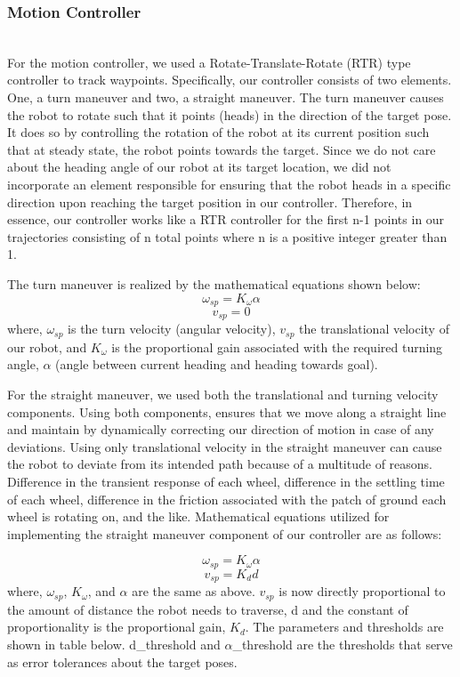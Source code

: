 \documentclass[journal]{IEEEtran}
\begin{document}
\subsubsection{Motion Controller} \hfill\\

For the motion controller, we used a Rotate-Translate-Rotate (RTR) \cite{journals/ker/Parsons04f,spong2005robot} type controller to track waypoints. Specifically, our controller consists of two elements. One, a turn maneuver and two, a straight maneuver. The turn maneuver causes the robot to rotate such that it points (heads) in the direction of the target pose. It does so by controlling the rotation of the robot at its current position such that at steady state, the robot points towards the target. Since we do not care about the heading angle of our robot at its target location, we did not incorporate an element responsible for ensuring that the robot heads in a specific direction upon reaching the target position in our controller. Therefore, in essence, our controller works like a RTR controller for the first n-1 points in our trajectories consisting of n total points where n is a positive integer greater than 1.

The turn maneuver is realized by the mathematical equations shown below:
$$\omega_{sp}=K_\omega \alpha$$
$$v_{sp}=0$$
where, $\omega_{sp}$ is the turn velocity (angular velocity), $v_{sp}$ the translational velocity of our robot, and $K_\omega$ is the proportional gain associated with the required turning angle, $\alpha$ (angle between current heading and heading towards goal).

For the straight maneuver, we used both the translational and turning velocity components. Using both components, ensures that we move along a straight line and maintain by dynamically correcting our direction of motion in case of any deviations. Using only translational velocity in the straight maneuver can cause the robot to deviate from its intended path because of a multitude of reasons. Difference in the transient response of each wheel, difference in the settling time of each wheel, difference in the friction associated with the patch of ground each wheel is rotating on, and the like. Mathematical equations utilized for implementing the straight maneuver component of our controller are as follows:

$$\omega_{sp}=K_\omega \alpha$$
$$v_{sp}=K_d d$$
where,  $\omega_{sp}$, $K_\omega$, and $\alpha$ are the same as above. $v_{sp}$  is now directly proportional to the amount of distance the robot needs to traverse, d and the constant of proportionality is the proportional gain, $K_d$. The parameters and thresholds are shown in table below. d\_threshold and $\alpha$\_threshold are the thresholds that serve as error tolerances about the target poses.\\
\end{document}
